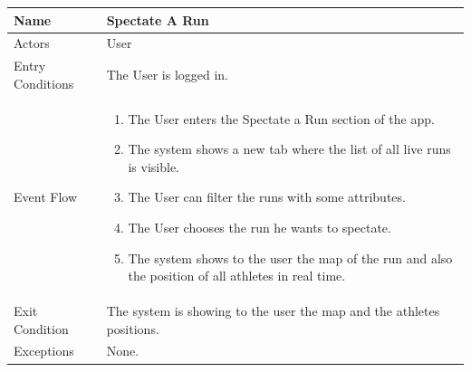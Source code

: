 \begin{enumerate}
\FloatBarrier
\begin{table}[h]
\begin{tabular}{|l|p{}|}
\hline
Name             & Spectate A Run \\ \hline
Actors           & User  \\ \hline
Entry Conditions & The User is logged in.    \\ \hline
Event Flow       & \begin{enumerate}
            \item The User enters the Spectate a Run section of the app.
            \item The system shows a new tab where the list of all live runs is visible.
            \item The User can filter the runs with some attributes.
            \item The User chooses the run he wants to spectate.
            \item The system shows to the user the map of the run and also the position of all athletes in real time.
        \end{enumerate}\\ \hline
Exit Condition   & The system is showing to the user the map and the athletes positions.\\ \hline
Exceptions       & None.\\ \hline
\end{tabular}
\end{table}
\clearpage
\FloatBarrier

\end{enumerate}



